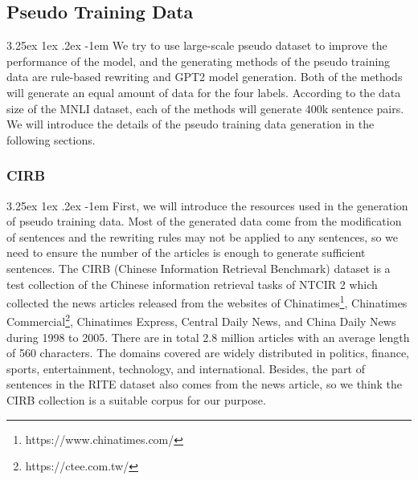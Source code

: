 \documentclass[12pt]{article}
\makeatletter
\renewcommand\paragraph{\@startsection{paragraph}{5}{\z@}%
  {3.25ex \@plus1ex \@minus.2ex}%
  {-1em}%
  {\normalfont\normalsize\bfseries}}
\makeatother
\begin{document}
\begin{CJK*}{UTF8}{bkai}
\begin{spacing}{1.77}
\subsection{Pseudo Training Data}
\paragraph{}
We try to use large-scale pseudo dataset to improve the performance of the model, and the generating methods of the pseudo training data are rule-based rewriting and GPT2 model generation. Both of the methods will generate an equal amount of data for the four labels. According to the data size of the MNLI dataset, each of the methods will generate 400k sentence pairs. We will introduce the details of the pseudo training data generation in the following sections.


\subsubsection{CIRB}
\paragraph{}
First, we will introduce the resources used in the generation of pseudo training data. Most of the generated data come from the modification of sentences and the rewriting rules may not be applied to any sentences, so we need to ensure the number of the articles is enough to generate sufficient sentences. The CIRB (Chinese Information Retrieval Benchmark)\cite{chen2001cirb} dataset is a test collection of the Chinese information retrieval tasks of NTCIR 2 which collected the news articles released from the websites of Chinatimes\footnote{https://www.chinatimes.com/}, Chinatimes Commercial\footnote{https://ctee.com.tw/}, Chinatimes Express, Central Daily News, and China Daily News during 1998 to 2005. There are in total 2.8 million articles with an average length of 560 characters. The domains covered are widely distributed in politics, finance, sports, entertainment, technology, and international. Besides, the part of sentences in the RITE dataset also comes from the news article, so we think the CIRB collection is a suitable corpus for our purpose.


\end{spacing}
\end{CJK*}
\end{document}
